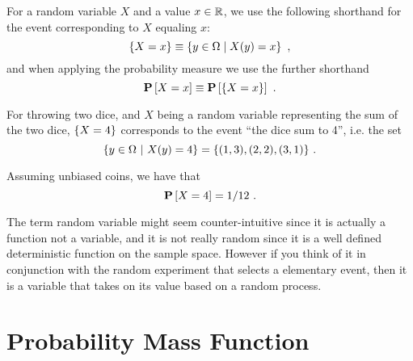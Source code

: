 \begin{flex}
\begin{gram}[Notation]
For a random variable $X$ and a value $x \in \mathbb{R}$, we use the following
shorthand for the event corresponding to $X$ equaling $x$:
\[\{X =x\} \equiv \left\{ y \in \Omega \;|\; X(y)  = x \right\}~,\]
and when applying the probability measure we use the further
shorthand
\[\mathbf{P}\left[{X = x}\right] \equiv \mathbf{P}\left[{\{X =x\}}\right]~.\]
\end{gram}

\begin{example}
  For throwing two dice, and $X$ being a random variable representing
  the sum of the two dice, $\{X =4\}$ corresponds to the
  event ``the dice sum to 4'', i.e. the set
  \[\{y \in \Omega~|~X(y) = 4\} = \{(1,3),(2,2),(3,1)\}~.\]

  Assuming unbiased coins, we have that
  \[\mathbf{P}\left[{X = 4}\right] = 1/12~.\]
\end{example}
\end{flex}

\begin{remark}
The term random variable might seem counter-intuitive
since it is actually a function not a variable, and it is not really
random since it is a well defined deterministic function on the
sample space.  However if you think of it in conjunction with the
random experiment that selects a elementary event, then it is a
variable that takes on its value based on a random process.
\end{remark}

\section{Probability Mass Function}
\label{sec:probability::randvar::pmf}

